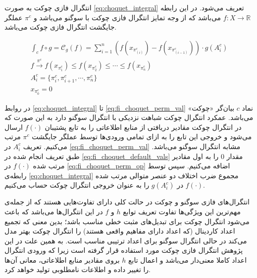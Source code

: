 انتگرال فازی چوکت به صورت \ref{eq:choquet_integral} تعریف می‌شود. در این رابطه
$f : X \rightarrow \mathbb{R}$
می‌باشد که از وجه تمایز انتگرال فازی چوکت با سوگنو می‌‌باشد و $\pi^c$ عملگر جایگشت انتگرال فازی چوکت می‌باشد.

\begin{eqnarray}
\int_{c} f \circ g = \mathcal{C}_g(f) = \sum_{i = 1}^{n} \left( f(x_{\pi_{(i)}^c}) - f(x_{\pi_{(i-1)}^c}) \right) \cdot g(A_i^c)\label{eq:choquet_integral}\\
f \xrightarrow{\pi^c} f(x_{\pi_1^c}) \leq f(x_{\pi_2^c}) \leq \cdots \leq f(x_{\pi_n^c})\label{eq:fi_choquet_perm_op}\\
A_i^c = \{\pi_i^c, \pi_{i+1}^c, \cdots, \pi_n^c\}\label{eq:fi_choquet_perm_val}\\
x_{\pi^c_0} = 0\label{eq:fi_choquet_default_vals}
\end{eqnarray}

در روابط
\ref{eq:choquet_integral} تا \ref{eq:fi_choquet_perm_val}
نماد $c$ بیان‌گر «چوکت» می‌‌باشد. عمکرد انتگرال چوکت شباهت نزدیکی با انتگرال سوگنو دارد به این صورت که در انتگرال چوکت مقادیر دریافتی از منابع اطلاعاتی را به تابع پشتیبان $f(\cdot)$ ارسال می‌شود و خروجی این تابع را به ازای تمامی ورودی‌ها توسط عملگر جایگشت $\pi^c$ مرتب می‌کنیم. تعریف $A_i^c$ در \ref{eq:fi_choquet_perm_val} مشابه انتگرال سوگنو می‌باشد. طبق تعریف انجام شده در \ref{eq:fi_choquet_default_vals} مقدار 0 را به اول مقادیر مرتب شده $f(\cdot)$ در \ref{eq:fi_choquet_perm_op} اضافه می‌کنیم. سپس توسط رابطه‌ی \ref{eq:choquet_integral} مجموع ضرب اختلاف دو عنصر متوالی مرتب شده $f(\cdot)$ در $g(A_i^c)$ را به عنوان خروجی انتگرال چوکت حساب می‌کنیم.

انتگرال‌های فازی سوگنو و چوکت در حالت کلی دارای تفاوت‌هایی هستند که از جمله‌ی مهم‌ترین این ویژگی‌ها تفاوت تعریف توابع $h$ و $f$ در این انتگرال‌ها می‌باشد که باعث می‌شود انتگرال چوکت برای تبدیل‌های مثبت خطی مناسب باشد؛ بدین معنی که تجمیع اعداد کاردینال (که اعداد دارای مفاهیم واقعی هستند) را انتگرال چوکت بهتر مدل می‌کند در حالی انتگرال سوگنو برای اعداد ترتیبی مناسب است. به همین علت در این پژوهش انتگرال فازی چوکت مورد استفاده قرار گرفته است زیرا که ورودی انتگرال اعداد کاملا معنی‌دار می‌باشد و اعمال تابع $h$ بروی مقادیر منابع اطلاعاتی، معانی آن‌ها را تغییر داده و اطلاعات نامطلوبی تولید خواهد کرد.